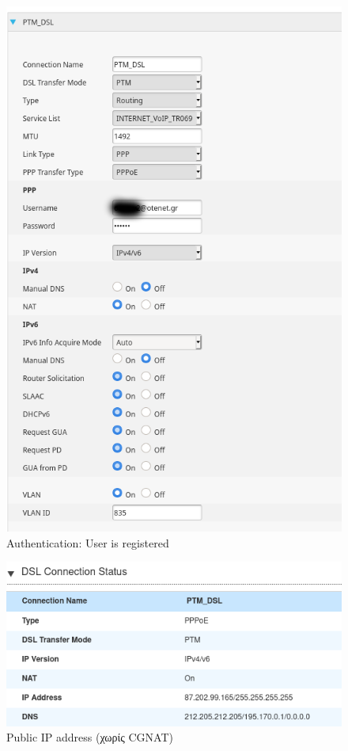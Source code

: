 \documentclass[12pt, a4paper]{article}
\begin{document}
\pagebreak
\begin{figure}[h!]
\centering
	\includegraphics[height=.75\textheight, width=\textwidth, keepaspectratio]{assets/router/authentication.png}
	\caption{Authentication: User is registered} 
    \label{fig:auth}
\end{figure}

\begin{figure}[h!]
    \centering
    \includegraphics[height=.3\textheight, width=\textwidth, keepaspectratio]{assets/router/public.png}
    \caption{Public IP address (χωρίς CGNAT)} 
    \label{fig:publicip}
\end{figure}
\end{document}
